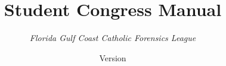 


\title{\Huge \textbf{Student Congress Manual}}
\author{\LARGE \emph{Florida Gulf Coast Catholic Forensics League}\vspace{.125in}}
\date{\Large Version \vv}

\usepackage[hmargin=1in,vmargin=1in]{geometry}
\usepackage{libertine}

\usepackage{fancyhdr}
\pagestyle{fancy}
\renewcommand{\headrulewidth}{.5pt}
\renewcommand{\footrulewidth}{.5pt}
\lhead{}
\rhead{}
\cfoot{}
\rfoot{\small \thepage}

\usepackage{sectsty}
\sectionfont{\centering \huge \sffamily \bfseries}
\subsectionfont{\Large \sffamily \bfseries}
\subsubsectionfont{\normalsize \bfseries}
\paragraphfont{\bfseries \sffamily}
\subparagraphfont{\itshape}

\usepackage{chngcntr}
\renewcommand{\thesection}{}
\renewcommand{\thesubsection}{\S\ \arabic{subsection}}
\renewcommand{\thesubsubsection}{\S\ \arabic{subsection}(\alph{subsubsection})}

\usepackage{enumitem}

\usepackage{nicefrac}

\usepackage{verbatim}


\usepackage{hyperref}
